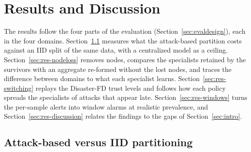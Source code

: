 
\section{Results and Discussion}
\label{sec:results}

The results follow the four parts of the evaluation (Section~\ref{sec:evaldesign}), each in the four domains. Section~\ref{sec:res-partition} measures what the attack-based partition costs against an IID split of the same data, with a centralized model as a ceiling. Section~\ref{sec:res-nodeloss} removes nodes, compares the specialists retained by the survivors with an aggregate re-formed without the lost nodes, and traces the difference between domains to what each specialist learns. Section~\ref{sec:res-switching} replays the Disaster-FD trust levels and follows how each policy spreads the specialists of attacks that appear late. Section~\ref{sec:res-windows} turns the per-sample alerts into window alarms at realistic prevalence, and Section~\ref{sec:res-discussion} relates the findings to the gaps of Section~\ref{sec:intro}.

\subsection{Attack-based versus IID partitioning}
\label{sec:res-partition}

